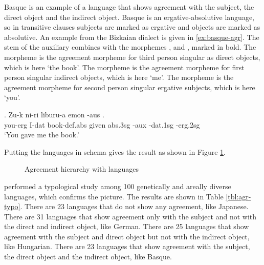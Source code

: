 Basque is an example of a language that shows agreement with the subject, the direct object and the indirect object. Basque is an ergative-absolutive language, so in transitive clauses subjects are marked as ergative and objects are marked as absolutive. An example from the Bizkaian dialect is given in \ref{ex:basque-agr}. The stem of the auxiliary  combines with the morphemes ,  and , marked in bold. The morpheme  is the agreement morpheme for third person singular as direct objects, which is here  `the book'. The morpheme  is the agreement morpheme for first person singular indirect objects, which is here  `me'. The morpheme  is the agreement morpheme for second person singular ergative subjects, which is here  `you'.

\exg. Zu-k ni-ri liburu-a emon  -aus  .\\
 you-\ac{erg} I-\ac{dat} book-\ac{def}.\ac{abs} given \ac{abs}.3\ac{sg} -\ac{aux} -\ac{dat}.1\ac{sg} -\ac{erg}.2\ac{sg}\\
 `You gave me the book.' \label{ex:basque-agr}

Putting the languages in  schema gives the result as shown in Figure \ref{fig:agr-sub-do-io-lang}.

 \begin{figure}[H]
   \centering
   \caption{Agreement hierarchy with languages}
   \label{fig:agr-sub-do-io-lang}
 \end{figure}

\citet{gilligan1987} performed a typological study among 100 genetically and areally diverse languages, which confirms the picture. The results are shown in Table \ref{tbl:agr-typo}. There are 23 languages that do not show any agreement, like Japanese. There are 31 languages that show agreement only with the subject and not with the direct and indirect object, like German. There are 25 languages that show agreement with the subject and direct object but not with the indirect object, like Hungarian. There are 23 languages that show agreement with the subject, the direct object and the indirect object, like Basque.

